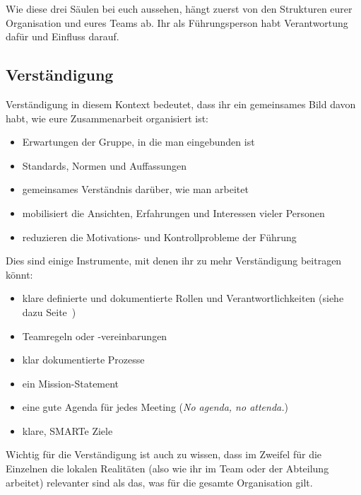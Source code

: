 Wie diese drei Säulen bei euch aussehen, hängt zuerst von den Strukturen eurer Organisation und eures Teams ab. Ihr als Führungsperson habt Verantwortung dafür und Einfluss darauf.

\subsection{Verständigung}

\glqq Verständigung\grqq{} in diesem Kontext bedeutet, dass ihr ein gemeinsames Bild davon habt, wie eure Zusammenarbeit organisiert ist:

\begin{itemize}
    \item Erwartungen der Gruppe, in die man eingebunden ist
    \item Standards, Normen und Auffassungen
    \item gemeinsames Verständnis darüber, wie man arbeitet
    \item mobilisiert die Ansichten, Erfahrungen und Interessen vieler Personen
    \item reduzieren die Motivations- und Kontrollprobleme der Führung
\end{itemize}

Dies sind einige Instrumente, mit denen ihr zu mehr Verständigung beitragen könnt:

\begin{itemize}
    \item klare definierte und dokumentierte Rollen und Verantwortlichkeiten (siehe dazu Seite~\pageref{rollen}) 
    \item Teamregeln oder -vereinbarungen 
    \item klar dokumentierte Prozesse 
    \item ein Mission-Statement 
    \item eine gute Agenda für jedes Meeting (\glqq\emph{No agenda, no attenda.\grqq}) 
    \item klare, SMARTe Ziele
\end{itemize}

Wichtig für die Verständigung ist auch zu wissen, dass im Zweifel für die Einzelnen die \glqq lokalen Realitäten\grqq{} (also wie ihr im Team oder der Abteilung arbeitet) relevanter sind als das, was für die gesamte Organisation gilt.

